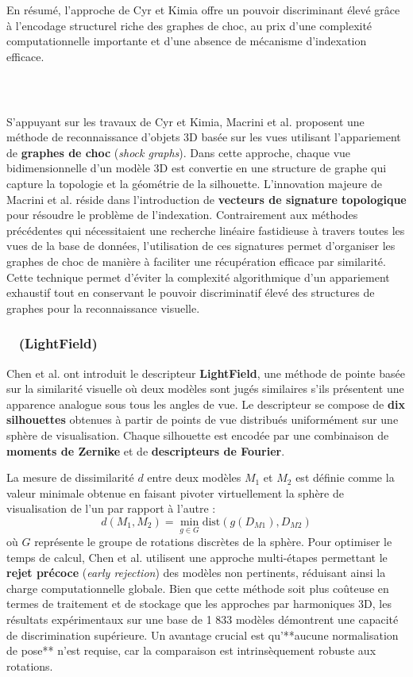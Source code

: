 \documentclass[11pt,a4paper,oneside]{report}
\begin{document}
En résumé, l'approche de Cyr et Kimia offre un pouvoir discriminant élevé grâce à l'encodage structurel riche des graphes de choc, au prix d'une complexité computationnelle importante et d'une absence de mécanisme d'indexation efficace.

\subsubsection{~\cite{macrini77}}

S'appuyant sur les travaux de Cyr et Kimia, Macrini et al. proposent une méthode de reconnaissance d'objets 3D basée sur les vues utilisant l'appariement de \textbf{graphes de choc} (\textit{shock graphs}). Dans cette approche, chaque vue bidimensionnelle d'un modèle 3D est convertie en une structure de graphe qui capture la topologie et la géométrie de la silhouette. L'innovation majeure de Macrini et al. réside dans l'introduction de \textbf{vecteurs de signature topologique} pour résoudre le problème de l'indexation. Contrairement aux méthodes précédentes qui nécessitaient une recherche linéaire fastidieuse à travers toutes les vues de la base de données, l'utilisation de ces signatures permet d'organiser les graphes de choc de manière à faciliter une récupération efficace par similarité. Cette technique permet d'éviter la complexité algorithmique d'un appariement exhaustif tout en conservant le pouvoir discriminatif élevé des structures de graphes pour la reconnaissance visuelle.

\subsubsection{~\cite{chen27,chen112} (LightField)}

Chen et al. ont introduit le descripteur \textbf{LightField}, une méthode de pointe basée sur la similarité visuelle où deux modèles sont jugés similaires s'ils présentent une apparence analogue sous tous les angles de vue. Le descripteur se compose de \textbf{dix silhouettes} obtenues à partir de points de vue distribués uniformément sur une sphère de visualisation. Chaque silhouette est encodée par une combinaison de \textbf{moments de Zernike} et de \textbf{descripteurs de Fourier}.

La mesure de dissimilarité $d$ entre deux modèles $M_1$ et $M_2$ est définie comme la valeur minimale obtenue en faisant pivoter virtuellement la sphère de visualisation de l'un par rapport à l'autre : $$d(M_1, M_2) = \min_{g \in G} \text{dist}(g(D_{M1}), D_{M2})$$ où $G$ représente le groupe de rotations discrètes de la sphère. Pour optimiser le temps de calcul, Chen et al. utilisent une approche multi-étapes permettant le \textbf{rejet précoce} (\textit{early rejection}) des modèles non pertinents, réduisant ainsi la charge computationnelle globale. Bien que cette méthode soit plus coûteuse en termes de traitement et de stockage que les approches par harmoniques 3D, les résultats expérimentaux sur une base de 1 833 modèles démontrent une capacité de discrimination supérieure. Un avantage crucial est qu'**aucune normalisation de pose** n'est requise, car la comparaison est intrinsèquement robuste aux rotations.
\end{document}
